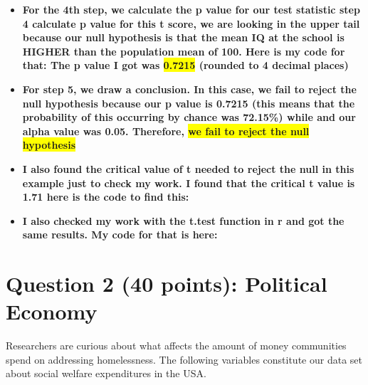 \documentclass[12pt,letterpaper]{article}
\begin{document}
\begin{enumerate}
\begin{itemize}
		
		
		\item \textbf{For the 4th step, we calculate the p value for our test statistic step 4 calculate p value for this t score, we are looking in the upper tail because our null hypothesis is that the mean IQ at the school is HIGHER than the population mean of 100. Here is my code for that: The p value I got was \colorbox{yellow}{0.7215} (rounded to 4 decimal places)}
		
		
		
		\item \textbf{For step 5, we draw a conclusion. In this case, we fail to reject the null hypothesis because our p value is 0.7215 (this means that the probability of this occurring by chance was 72.15\%) while and our alpha value was 0.05. Therefore, \colorbox{yellow}{we fail to reject the null hypothesis}}
			
		\item \textbf{I also found the critical value of t needed to reject the null in this example just to check my work. I found that the critical t value is 1.71 here is the code to find this:}
		
		
		\item \textbf{I also checked my work with the t.test function in r and got the same results. My code for that is here:}
		
			
			
		
	\end{itemize}
\end{enumerate}

\newpage

	\section*{Question 2 (40 points): Political Economy}

\noindent Researchers are curious about what affects the amount of money communities spend on addressing homelessness. The following variables constitute our data set about social welfare expenditures in the USA. \\
\vspace{.5cm}
\end{document}
